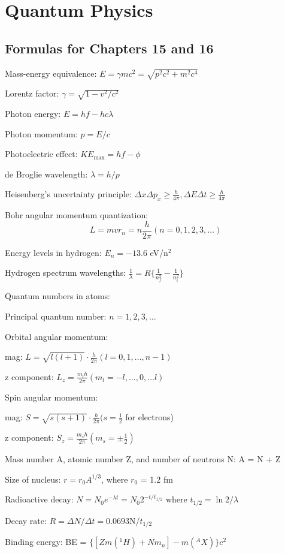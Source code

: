 \documentclass[../physics12.tex]{subfiles}
\begin{document}
\chapter{Quantum Physics}
\section{Formulas for Chapters 15 and 16}
Mass-energy equivalence: $E=\gamma mc^2 = \sqrt{p^2c^2+m^2c^4}$

Lorentz factor: $\gamma = \sqrt{1-v^2/c^2}$

Photon energy: $E=hf-hc\lambda$

Photon momentum: $p=E/c$

Photoelectric effect: $KE_{\text{max}} = hf-\phi$

de Broglie wavelength: $\lambda = h/p$

Heisenberg's uncertainty principle: $\Delta x\Delta p_x \geq \frac{h}{4\pi}, \Delta E\Delta t \geq \frac{h}{4\pi}$

Bohr angular momentum quantization: 
\[ L = mvr_n = n\frac{h}{2\pi} (n=0,1,2,3,\dots) \]

Energy levels in hydrogen: $E_n = -13.6$ eV/n$^2$

Hydrogen spectrum wavelengths: $\frac{1}{\lambda} = R\{\frac{1}{n_f^2}-\frac{1}{n_i^2}\}$

Quantum numbers in atoms:

Principal quantum number: $n=1,2,3,\dots$

Orbital angular momentum:

mag: $L=\sqrt{l(l+1)}\cdot \frac{h}{2\pi} (l=0,1,\dots,n-1)$

z component: $L_z = \frac{m_l h}{2\pi} (m_l = -l,\dots,0,\dots l)$

Spin angular momentum:

mag: $S=\sqrt{s(s+1)}\cdot \frac{h}{2\pi} (s=\frac{1}{2}$ for electrons)

z component: $S_z = \frac{m_s h}{2\pi} (m_s = \pm \frac{1}{2})$

Mass number A, atomic number Z, and number of neutrons N: A = N + Z 

Size of nucleus: $r = r_0 A^{1/3}$, where $r_0$ = 1.2 fm 

Radioactive decay: $N=N_0e^{-\lambda t}=N_0 2^{-t/t_{1/2}}$ where $t_{1/2} = \ln 2/\lambda$

Decay rate: $R = \Delta N/\Delta t = 0.0693$N/$t_{1/2}$

Binding energy: BE = $\{[Zm(^1 H)+Nm_n]-m(^A X)\}c^2$
\end{document}

